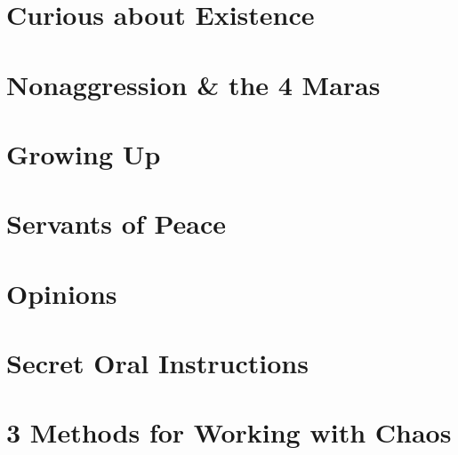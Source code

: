 \documentclass[oneside]{book}
\numberwithin{equation}{section}
\begin{document}

\section{Curious about Existence}


\section{Nonaggression \& the 4 Maras}


\section{Growing Up}


\section{Servants of Peace}


\section{Opinions}


\section{Secret Oral Instructions}


\section{3 Methods for Working with Chaos}

\end{document}
